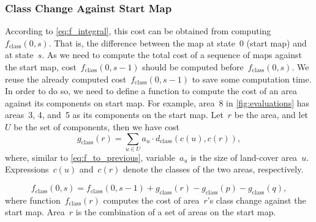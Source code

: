 \documentclass[ijgi,article,submit,moreauthors,pdftex]{Definitions/mdpi}
\begin{document}
\subsubsection{Class Change Against Start Map}
\label{sec:class_change_start}
According to \eq\ref{eq:f_integral}, 
this cost can be obtained from computing~$f_\mathrm{class} (0, s)$.
That is, the difference between the map at state~$0$ (start map) and at state~$s$.
As we need to compute the total cost of a sequence of maps against the start map,
cost~$f_\mathrm{class} (0, s-1)$ should be computed before~$f_\mathrm{class} (0, s)$.
We reuse the already computed cost~$f_\mathrm{class} (0, s-1)$ 
to save some computation time.
In order to do so,
we need to define a function to compute the cost of 
an area against its components on start map.
For example, area~8 in \fig\ref{fig:evaluations} 
has areas~3, 4, and~5 as its components on the start map. 
Let~$r$ be the area, and let~$U$ be the set of components,
then we have cost
\begin{equation}
\label{eq:f_set}
g_\mathrm{class} (r) = 
\sum\limits_{u \in U} a_u \cdot d_\mathrm{class}(c(u),c(r)),
\end{equation}
where, similar to \eq\ref{eq:f_to_previous},
variable~$a_u$ is the size of land-cover area~$u$. 
Expressions~$c(u)$ and~$c(r)$ denote the classes of the two areas, respectively.


\begin{equation}
\label{eq:F_to_start}
f_\mathrm{class}(0,s)=f_\mathrm{class} (0, s-1) 
+ g_\mathrm{class} (r)
- g_\mathrm{class} (p)
- g_\mathrm{class} (q),
\end{equation}
where function~$f_\mathrm{class} (r)$ 
computes the cost of area~$r$'s class change against the start map.
Area~$r$ is the combination of a set of areas on the start map.




%

\end{document}
